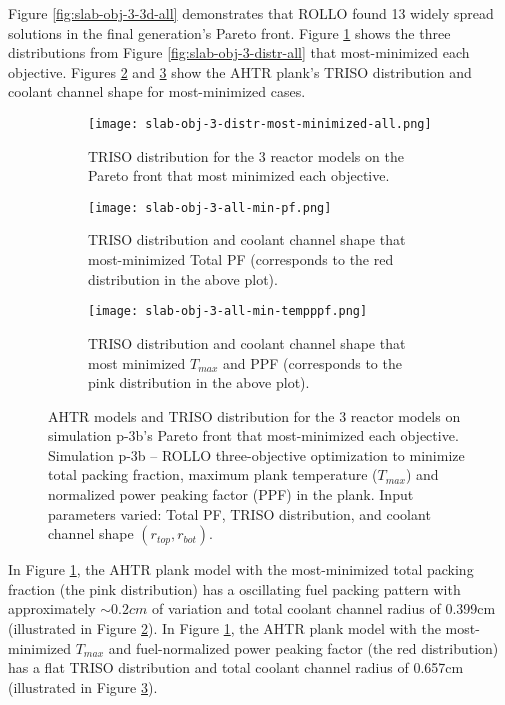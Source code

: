 Figure \ref{fig:slab-obj-3-3d-all} demonstrates that \gls{ROLLO} found 13 widely spread 
solutions in the final generation's Pareto front. 
Figure \ref{fig:slab-obj-3-distr-most-minimized-distr-all} shows the three distributions 
from Figure \ref{fig:slab-obj-3-distr-all} that most-minimized each objective. 
Figures \ref{fig:slab-obj-3-all-min-pf} and \ref{fig:slab-obj-3-all-min-tempppf} show 
the \gls{AHTR} plank's TRISO distribution and coolant channel shape for most-minimized 
cases. 
\begin{figure}[htbp!]
    \begin{subfigure}{\textwidth}
        \texttt{[image: slab-obj-3-distr-most-minimized-all.png]}
        \caption{TRISO distribution for the 3 reactor models on the Pareto 
        front that most minimized each objective.}
        \label{fig:slab-obj-3-distr-most-minimized-distr-all}
    \end{subfigure}
    \begin{subfigure}{\textwidth}
        \texttt{[image: slab-obj-3-all-min-pf.png]}
        \caption{TRISO distribution and coolant channel shape that most-minimized Total 
        PF (corresponds to the red distribution in the above plot).}
        \label{fig:slab-obj-3-all-min-pf}
    \end{subfigure}
    \begin{subfigure}{\textwidth}
        \texttt{[image: slab-obj-3-all-min-tempppf.png]}
        \caption{TRISO distribution and coolant channel shape that most minimized 
        $T_{max}$ and PPF (corresponds to the pink distribution in the above plot).}
        \label{fig:slab-obj-3-all-min-tempppf}
    \end{subfigure}
    \caption{AHTR models and TRISO distribution for the 3 reactor models on simulation 
    p-3b's Pareto front that most-minimized each objective.
    Simulation p-3b -- ROLLO three-objective optimization to minimize total 
    packing fraction, maximum plank temperature ($T_{max}$) and normalized power peaking 
    factor (PPF) in the plank. 
    Input parameters varied: Total PF, TRISO distribution, and coolant channel shape 
    $(r_{top}, r_{bot})$.}
    \label{fig:slab-obj-3-distr-most-minimized-all}
\end{figure}

In Figure \ref{fig:slab-obj-3-distr-most-minimized-distr-all}, the \gls{AHTR} plank model 
with the most-minimized total packing fraction (the pink distribution) has a oscillating fuel 
packing pattern with approximately $\sim0.2cm$ of variation and total coolant channel radius 
of 0.399cm (illustrated in Figure \ref{fig:slab-obj-3-all-min-pf}).
In Figure \ref{fig:slab-obj-3-distr-most-minimized-distr-all}, the \gls{AHTR} plank model with 
the most-minimized $T_{max}$ and fuel-normalized power peaking factor (the red distribution) 
has a flat TRISO distribution and total coolant channel radius of 0.657cm 
(illustrated in Figure \ref{fig:slab-obj-3-all-min-tempppf}). 

